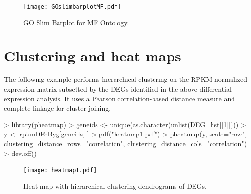 \documentclass{article}
\begin{document}
\begin{figure}[H]
  \centering
   \texttt{[image: GOslimbarplotMF.pdf]}
   \caption{GO Slim Barplot for MF Ontology.}
   \label{fig:GOMF}
\end{figure}

\section{Clustering and heat maps}
The following example performs hierarchical clustering on the RPKM normalized expression matrix subsetted by the DEGs identified in the 
above differential expression analysis. It uses a Pearson correlation-based distance measure and complete linkage for cluster joining.
\begin{Schunk}
\begin{Sinput}
> library(pheatmap)
> geneids <- unique(as.character(unlist(DEG_list[[1]])))
> y <- rpkmDFeByg[geneids, ]
> pdf("heatmap1.pdf")
> pheatmap(y, scale="row", clustering_distance_rows="correlation", clustering_distance_cols="correlation")
> dev.off()
\end{Sinput}
\end{Schunk}

\begin{figure}[H]
  \centering
   \texttt{[image: heatmap1.pdf]}
   \caption{Heat map with hierarchical clustering dendrograms of DEGs.}
   \label{fig:heatmap}
\end{figure}
\end{document}
